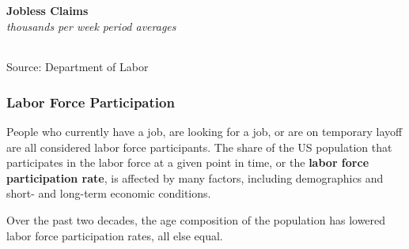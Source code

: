 \documentclass{report}
\begin{document}
{\begin{minipage}{0.76\textwidth}
\normalsize \textbf{Jobless Claims}\\
\footnotesize{\textit{thousands per week \hspace{52mm} period averages}}\\
\noindent \hspace*{-2mm}  \setlength{\tabcolsep}{4.1pt} \color{black!90}
		{\renewcommand{\arraystretch}{1.6}
		 \begin{tabular}{p{32mm} R{10mm} R{10mm} R{10mm} R{10mm} R{8mm} R{8mm} R{8mm} }
			  \hline
		\end{tabular}}\vspace{-2mm}
		
\footnotesize{Source: Department of Labor}
\end{minipage}
\newpage
\hypertarget{labp}{\label{labp}}
\begin{minipage}{0.76\textwidth} 
\subsubsection*{Labor Force Participation}
\small People who currently have a job, are looking for a job, or are on temporary layoff are all considered labor force participants. The share of the US population that participates in the labor force at a given point in time, or the \textbf{labor force participation rate}, is affected by many factors, including demographics and short- and long-term economic conditions.

Over the past two decades, the age composition of the population has lowered labor force participation rates, all else equal. 


\vspace{2mm}


\end{minipage}}
\end{document}

